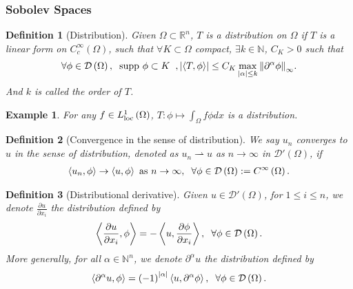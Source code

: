 \documentclass[11pt,a4paper,center,notitlepage]{article}
\numberwithin{equation}{section}
\newtheorem{definition}{Definition}[section]
\newtheorem{example}{Example}[section]
\begin{document}
\subsubsection{Sobolev Spaces}
\begin{definition}[Distribution] Given $\Omega \subset \mathbb{R}^n$, $T$ is a distribution on $\Omega$ if $T$ is a linear form on $C_c^\infty \left(\Omega\right)$, such that $\forall K \subset \Omega$ compact, $\exists k \in \mathbb{N}$, ${C_K}>0$ such that
\begin{align}
\forall \phi  \in \mathcal{D}\left( \Omega  \right),\hspace{2mm}{\rm supp}\ \phi \subset K \hspace{2mm},\left| {\left\langle {T,\phi } \right\rangle } \right| \le {C_K}\mathop {\max }\limits_{\left| \alpha  \right| \le k} {\left\| {{\partial ^\alpha }\phi } \right\|_\infty } .
\end{align}
And $k$ is called the order of $T$.
\end{definition}
\begin{example}
For any $f \in L_{\rm loc}^1\left( \Omega  \right)$, $T:\phi  \mapsto \int_\Omega  {f\phi dx} $ is a distribution.
\end{example}
\begin{definition}[Convergence in the sense of distribution]
We say $u_n$ converges to $u$ in the sense of distribution, denoted as $u_n \rightharpoonup u$ as $n\to \infty$ in $\mathcal{D}'\left(\Omega\right)$, if 
\begin{align}
\left\langle {{u_n},\phi } \right\rangle  \to \left\langle {u,\phi } \right\rangle \mbox{ as } n \to \infty ,\hspace{2mm}\forall \phi  \in \mathcal{D}\left( \Omega  \right): = C^\infty \left( \Omega  \right).
\end{align}
\end{definition}

\begin{definition}[Distributional derivative]
Given $u\in \mathcal{D}'\left(\Omega\right)$, for $1\le i \le n$, we denote $\frac{{\partial u}}{{\partial {x_i}}}$ the distribution defined by
\begin{align}
\left\langle {\frac{{\partial u}}{{\partial {x_i}}},\phi } \right\rangle  =  - \left\langle {u,\frac{{\partial \phi }}{{\partial {x_i}}}} \right\rangle ,\hspace{2mm}\forall \phi  \in \mathcal{D}\left( \Omega  \right).
\end{align}
More generally, for all $\alpha \in \mathbb{N}^n$, we denote $\partial ^\alpha u$ the distribution defined by
\begin{align}
\left\langle {{\partial ^\alpha }u,\phi } \right\rangle  = {\left( { - 1} \right)^{\left| \alpha  \right|}}\left\langle {u,{\partial ^\alpha }\phi } \right\rangle ,\hspace{2mm}\forall \phi  \in \mathcal{D}\left( \Omega  \right).
\end{align}
\end{definition}
\end{document}
